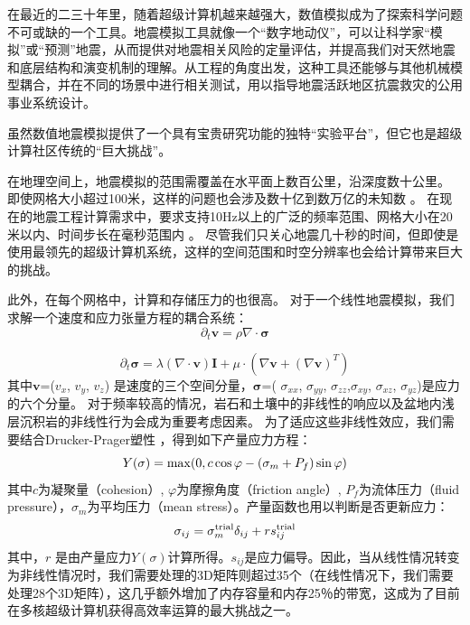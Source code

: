 \documentclass[degree=doctor]{thuthesis}
\begin{document}
在最近的二三十年里，随着超级计算机越来越强大，数值模拟成为了探索科学问题不可或缺的一个工具。地震模拟工具就像一个“数字地动仪”，可以让科学家“模拟”或“预测”地震，从而提供对地震相关风险的定量评估，并提高我们对天然地震和底层结构和演变机制的理解。从工程的角度出发，这种工具还能够与其他机械模型耦合，并在不同的场景中进行相关测试，用以指导地震活跃地区抗震救灾的公用事业系统设计。

虽然数值地震模拟提供了一个具有宝贵研究功能的独特“实验平台”，但它也是超级计算社区传统的“巨大挑战”。

在地理空间上，地震模拟的范围需覆盖在水平面上数百公里，沿深度数十公里。 即使网格大小超过100米，这样的问题也会涉及数十亿到数万亿的未知数 \citep{cui2010scalable}。 在现在的地震工程计算需求中，要求支持10Hz以上的广泛的频率范围、网格大小在20米以内、时间步长在毫秒范围内  \citep{cui2013physics}。 尽管我们只关心地震几十秒的时间，但即使是使用最领先的超级计算机系统，这样的空间范围和时空分辨率也会给计算带来巨大的挑战。

此外，在每个网格中，计算和存储压力的也很高。 对于一个线性地震模拟，我们求解一个速度和应力张量方程的耦合系统：
\begin{equation}
\partial_{t}\bm{v}=\rho\nabla\cdot\bm{\sigma}
\end{equation}

\begin{equation}
  \partial_{t}  \bm{\sigma} = \lambda (\nabla    \cdot \bm{v}) \bm{I} + \mu \cdot (\nabla \bm{v}  + (\nabla \bm{v})^{T})
\end{equation}
其中$\bm{v}$=({$v_{x}$}, {$v_{y}$}, {$v_{z}$}) 是速度的三个空间分量，$\bm{\sigma}$=( $\sigma_{xx}$, $\sigma_{yy}$, $\sigma_{zz}$,$\sigma_{xy}$, $\sigma_{xz}$, $\sigma_{yz}$)是应力的六个分量。 对于频率较高的情况，岩石和土壤中的非线性的响应以及盆地内浅层沉积岩的非线性行为会成为重要考虑因素。 为了适应这些非线性效应，我们需要结合Drucker-Prager塑性 \citep {roten2016high}，得到如下产量应力方程：
\begin{equation}
Y(\sigma)={\rm max}(0, c \cos \varphi - ( \sigma_{m} + P_{f} ) \sin\varphi)
\end{equation}
其中$c$为凝聚量（cohesion）, $\varphi$为摩擦角度（friction angle）, $P_{f}$为流体压力（fluid
pressure），$\sigma_{m}$为平均压力（mean stress）。产量函数也用以判断是否更新应力：
\begin{equation}
\sigma_{ij} = \sigma_{m}^{\rm trial} \delta_{ij} + r s_{ij}^{\rm{trial}}
\end{equation}
其中，$r$ 是由产量应力$Y(\sigma)$计算所得。$s_{ij}$是应力偏导。因此，当从线性情况转变为非线性情况时，我们需要处理的3D矩阵则超过35个（在线性情况下，我们需要处理28个3D矩阵）\citep {roten2016high}，这几乎额外增加了内存容量和内存25％的带宽，这成为了目前在多核超级计算机获得高效率运算的最大挑战之一。
\end{document}

